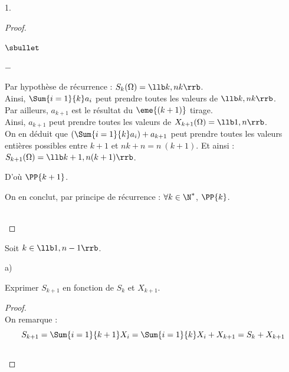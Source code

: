 \begin{noliste}{1.}
\begin{proof}
\begin{remark}
\begin{noliste}{$\sbullet$}
\begin{noliste}{\fitem}
\begin{noliste}{$-$}
          \item Par hypothèse de récurrence : $S_k(\Omega) = \llb k,
            nk\rrb$.\\
            Ainsi, $\Sum{i=1}{k} a_i$ peut prendre toutes les valeurs
            de $\llb k, nk \rrb$.\\
            Par ailleurs, $a_{k+1}$ est le résultat du $\eme{(k+1)}$
            tirage.\\
            Ainsi, $a_{k+1}$ peut prendre toutes les valeurs de
            $X_{k+1}(\Omega)=\llb 1,n\rrb$.\\[.2cm]
            On en déduit que $\left( \Sum{i=1}{k} a_i \right) +
            a_{k+1}$ peut prendre toutes les valeurs entières
            possibles entre $k + 1$ et $nk + n = n \ (k+1)$.
            Et ainsi : $S_{k+1}(\Omega) = \llb k+1, n(k+1)\rrb$.
          \end{noliste}
          D'où $\PP{k+1}$.
        \end{noliste}
        On en conclut, par principe de récurrence : $\forall k \in
        \N^*$, $\PP{k}$.
      \end{noliste}
    \end{remark}~\\[-1.4cm]
  \end{proof}


\newpage


\item Soit $k\in\llb 1,n-1\rrb$.
  \begin{noliste}{a)}
  \item Exprimer $S_{k+1}$ en fonction de $S_k$ et $X_{k+1}$.
    
    \begin{proof}~\\
      On remarque :
      \[
      S_{k+1}=\Sum{i=1}{k+1} X_i = \Sum{i=1}{k} X_i + X_{k+1} = 
      S_k+X_{k+1}
      \]
      ~\\[-1cm]
    \end{proof}
    

\end{noliste}
\end{noliste}
